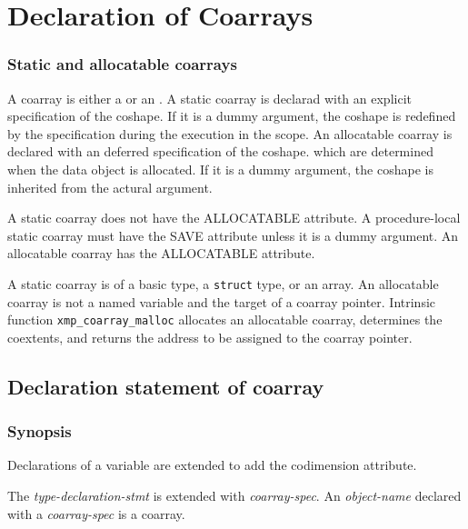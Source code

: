 \section{Declaration of Coarrays}
\label{sec:Declaration of Coarrays}
\subsubsection*{Static and allocatable coarrays}
A coarray is either a  or an .
%
A static coarray is declarad with an explicit specification of the coshape.
If it is a dummy argument, the coshape is redefined by the specification during 
the execution in the scope.
%
An allocatable coarray is declared with an deferred specification of the coshape.
which are determined when the data object is allocated.
If it is a dummy argument, the coshape is inherited from the actural argument.

{\onlyF} 
A static coarray does not have the ALLOCATABLE attribute.
A procedure-local static coarray must have the SAVE attribute 
unless it is a dummy argument.
An allocatable coarray has the ALLOCATABLE attribute.

{\onlyC} 
A static coarray is of a basic type, a {\tt struct} type, or an array.
An allocatable coarray is not a named variable and the target of a coarray pointer.
Intrinsic function {\tt xmp\_coarray\_malloc} allocates an allocatable coarray,
determines the coextents, and returns the address to be assigned to the coarray pointer.




\subsection{Declaration statement of coarray}
\label{sec:Declaration statement of coarray}

\subsubsection*{Synopsis}
Declarations of a variable are extended to add the codimension attribute.

{\onlyF}
The {\it type-declaration-stmt} is extended with {\it coarray-spec}.
An {\it object-name} declared with a {\it coarray-spec} is a coarray.

